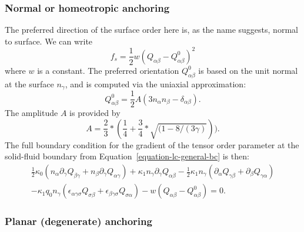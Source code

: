 \subsubsection{Normal or homeotropic anchoring}
The preferred direction of the surface order here is, as the name
suggests, normal to surface. We can write
\begin{equation}
f_s = {\textstyle\frac{1}{2}} w (Q_{\alpha\beta} - Q_{\alpha\beta}^0)^2
\end{equation}
where $w$ is a constant.
The preferred orientation $Q^0_{\alpha\beta}$ is based on the unit normal
at the surface $n_\gamma$, and is computed via the uniaxial approximation:
\begin{equation}
Q^0_{\alpha\beta}
= {\textstyle \frac{1}{2}} A (3n_\alpha n_\beta - \delta_{\alpha\beta}).
\end{equation}
The amplitude $A$ is provided by 
\begin{equation}
\label{equation-lc-amplitude}
A=\frac{2}{3}*(\frac{1}{4}+\frac{3}{4}*\sqrt{(1 - 8/(3\gamma)})).
\end{equation}
The full boundary condition for the gradient of the tensor order parameter
at the solid-fluid boundary from Equation~\ref{equation-lc-general-bc}
is then:
\begin{eqnarray}
{\textstyle\frac{1}{2}} \kappa_0 (n_\alpha \partial_\gamma Q_{\beta\gamma}
+ n_\beta \partial_\gamma Q_{\alpha\gamma})
+ \kappa_1 n_\gamma \partial_\gamma Q_{\alpha\beta}
- {\textstyle\frac{1}{2}} \kappa_1 n_\gamma ( \partial_\alpha Q_{\gamma\beta}
+ \partial_\beta Q_{\gamma\alpha})
\nonumber
\\
- \kappa_1 q_0 n_\gamma (\epsilon_{\alpha\gamma\sigma} Q_{\sigma\beta}
+ \epsilon_{\beta\gamma\sigma}Q_{\sigma\alpha})
- w(Q_{\alpha\beta} - Q_{\alpha\beta}^0) = 0.
\label{equation-lc-bc-normal}
\end{eqnarray}

\subsubsection{Planar (degenerate) anchoring}

